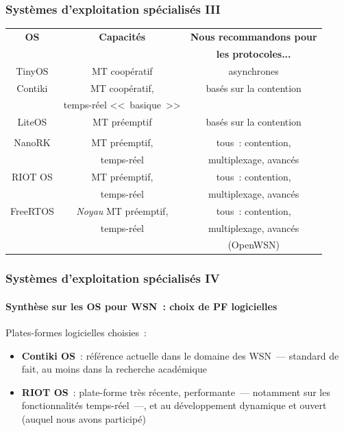 \documentclass[10pt,c]{beamer}
\newcommand{\nom}[1]{\textbf{#1}}
\begin{document}
\begin{frame}[label=osDedies3]
\frametitle{Systèmes d'exploitation spécialisés III}

\begin{tabular}{|c|c|c|}
\hline
\textbf{OS} & \textbf{Capacités}         & \textbf{Nous recommandons pour} \\
            &                            & \textbf{les protocoles...} \\
\hline
   TinyOS   & MT coopératif              & asynchrones \\
\hline
   Contiki  & MT coopératif,             & basés sur la contention \\
            &  temps-réel <<~basique~>>  & \\
\hline
   LiteOS   & MT préemptif               & basés sur la  contention \\
            &                            & \\
\hline
   NanoRK   & MT préemptif,              & tous~: contention, \\
            &  temps-réel                &  multiplexage, avancés \\
\hline
  RIOT OS   & MT préemptif,              & tous~: contention, \\
            &  temps-réel                &  multiplexage, avancés \\
\hline
  FreeRTOS  & \textit{Noyau} MT préemptif, & tous~: contention, \\
            &  temps-réel                  &  multiplexage, avancés \\
            &                              &  (OpenWSN) \\
\hline
\end{tabular}

\end{frame}

\begin{frame}[label=osDedies4]
\frametitle{Systèmes d'exploitation spécialisés IV}
\framesubtitle{Synthèse sur les OS pour WSN~: choix de PF logicielles}

\begin{block}{Plates-formes logicielles choisies~:}

\begin{itemize}
\item \nom{Contiki OS}~: référence actuelle dans le domaine des WSN~---
           standard de fait, au moins dans la recherche académique
\item \nom{RIOT OS}~: plate-forme très récente, performante~--- notamment
           sur les fonctionnalités temps-réel~---, et au développement
           dynamique et ouvert (auquel nous avons participé)
\end{itemize}

\end{block}

\end{frame}
\end{document}
